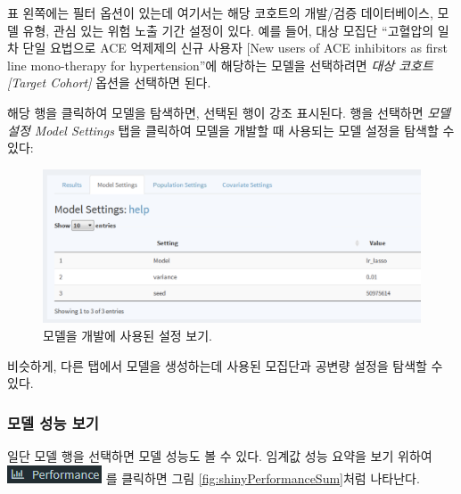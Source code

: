 \documentclass[10.5pt]{book}
\theoremstyle{definition}
\theoremstyle{definition}
\theoremstyle{definition}
\theoremstyle{remark}
\begin{document}
표 왼쪽에는 필터 옵션이 있는데 여기서는 해당 코호트의 개발/검증
데이터베이스, 모델 유형, 관심 있는 위험 노출 기간 설정이 있다. 예를
들어, 대상 모집단 ``고혈압의 일차 단일 요법으로 ACE 억제제의 신규 사용자
{[}New users of ACE inhibitors as first line mono-therapy for
hypertension''에 해당하는 모델을 선택하려면 \emph{대상 코호트{[}Target
Cohort{]}} 옵션을 선택하면 된다.

해당 행을 클릭하여 모델을 탐색하면, 선택된 행이 강조 표시된다. 행을
선택하면 \emph{모델 설정 Model Settings} 탭을 클릭하여 모델을 개발할 때
사용되는 모델 설정을 탐색할 수 있다:

\begin{figure}

{\centering \includegraphics[width=1\linewidth]{images/PatientLevelPrediction/shiny/shinyModel} 

}

\caption{모델을 개발에 사용된 설정 보기.}\label{fig:shinyModel}
\end{figure}

비슷하게, 다른 탭에서 모델을 생성하는데 사용된 모집단과 공변량 설정을
탐색할 수 있다.

\subsubsection*{모델 성능 보기}\label{--}

일단 모델 행을 선택하면 모델 성능도 볼 수 있다. 임계값 성능 요약을 보기
위하여 \includegraphics{images/PatientLevelPrediction/performance.png}
를 클릭하면 그림 \ref{fig:shinyPerformanceSum}처럼 나타난다.
\end{document}
